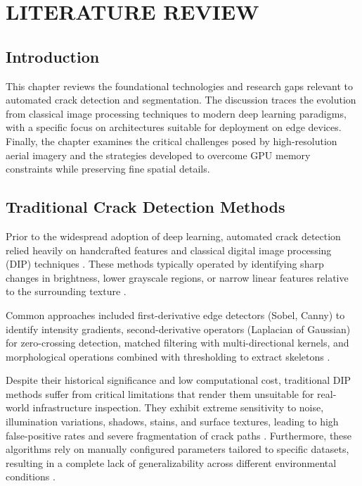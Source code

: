 \chapter{LITERATURE REVIEW}
\label{chap:literature_review}

\section{Introduction}
\hs This chapter reviews the foundational technologies and research gaps relevant to automated crack detection and segmentation. The discussion traces the evolution from classical image processing techniques to modern deep learning paradigms, with a specific focus on architectures suitable for deployment on edge devices. Finally, the chapter examines the critical challenges posed by high-resolution aerial imagery and the strategies developed to overcome GPU memory constraints while preserving fine spatial details.

\section{Traditional Crack Detection Methods}
\label{sec:traditional_crack_detection_methods}
\hs Prior to the widespread adoption of deep learning, automated crack detection relied heavily on handcrafted features and classical digital image processing (DIP) techniques \cite{01-zhang-2024a, 02-zhen-liang-2025}. These methods typically operated by identifying sharp changes in brightness, lower grayscale regions, or narrow linear features relative to the surrounding texture \cite{03-liu-2019}.

\hs Common approaches included first-derivative edge detectors (Sobel, Canny) to identify intensity gradients, second-derivative operators (Laplacian of Gaussian) for zero-crossing detection, matched filtering with multi-directional kernels, and morphological operations combined with thresholding to extract skeletons \cite{01-zhang-2024a, 02-zhen-liang-2025}.

\hs Despite their historical significance and low computational cost, traditional DIP methods suffer from critical limitations that render them unsuitable for real-world infrastructure inspection. They exhibit extreme sensitivity to noise, illumination variations, shadows, stains, and surface textures, leading to high false-positive rates and severe fragmentation of crack paths \cite{03-liu-2019,02-zhen-liang-2025, 05-kyem-2025}. Furthermore, these algorithms rely on manually configured parameters tailored to specific datasets, resulting in a complete lack of generalizability across different environmental conditions \cite{03-liu-2019}.

